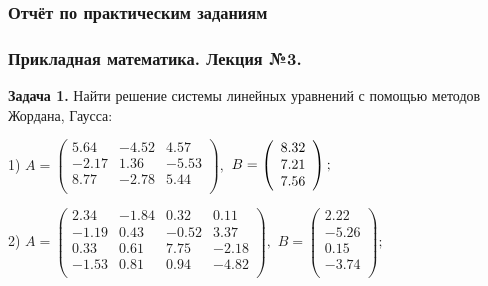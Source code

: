 \documentclass[a4paper, 12pt]{article}
\begin{document}
    \begin{center}
        \subsubsection*{Отчёт по практическим заданиям}
        \subsubsection*{Прикладная математика. Лекция №3.}
    \end{center}

    \quad \textbf{Задача 1.} Найти решение системы линейных уравнений с помощью методов Жордана, Гаусса:
    
    \begin{center}

        1) $A = \left(
            \begin{array}{ccc}
                5.64 & -4.52 & 4.57 \\
                -2.17 & 1.36 & -5.53 \\
                8.77 & -2.78 & 5.44 \\
            \end{array}
         \right),$ $B = \left(
            \begin{array}{c}
                8.32 \\
                7.21 \\
                7.56 \\
            \end{array}
         \right);\newline$

         2) $A = \left(
            \begin{array}{cccc}
                2.34 & -1.84 & 0.32 & 0.11 \\
                -1.19 & 0.43 & -0.52 & 3.37 \\
                0.33 & 0.61 & 7.75 & -2.18 \\
                -1.53 & 0.81 & 0.94 & -4.82 \\
            \end{array}
         \right),$ $B = \left(
            \begin{array}{c}
                2.22 \\
                -5.26 \\
                0.15 \\
                -3.74 \\
            \end{array}
         \right);$

    \end{center}
\end{document}
